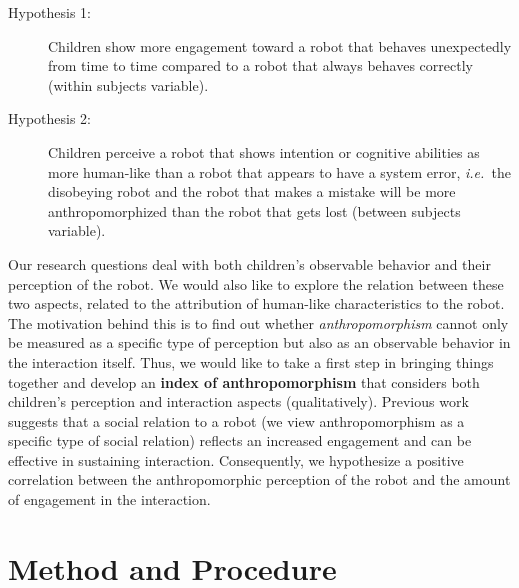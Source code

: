\documentclass{sig-alternate}
\newcommand{\ie}{{\textit{i.e.~}}}
\begin{document}
\begin{description}

    \item[Hypothesis 1:] Children show more engagement toward a robot that
        behaves unexpectedly from time to time compared to a robot that always
        behaves correctly (within subjects variable).

    \item[Hypothesis 2:] Children perceive a robot that shows intention or
        cognitive abilities as more human-like than a robot that appears to have
        a system error, \ie the disobeying robot and the robot that makes a
        mistake will be more anthropomorphized than the robot that gets lost
        (between subjects variable).

\end{description}


Our research questions deal with both children's observable behavior and their
perception of the robot. We would also like to explore the relation between
these two aspects, related to the attribution of human-like characteristics to
the robot. The motivation behind this is to find out whether
\textit{anthropomorphism} cannot only be measured as a specific type of
perception but also as an observable behavior in the interaction itself. Thus,
we would like to take a first step in bringing things together and develop an
\textbf{index of anthropomorphism} that considers both children's perception and
interaction aspects (qualitatively). Previous work suggests that a social
relation to a robot (we view anthropomorphism as a specific type of social
relation) reflects an increased engagement and can be effective in sustaining
interaction. Consequently, we hypothesize a positive correlation between the
anthropomorphic perception of the robot and the amount of engagement in the
interaction.




\section{Method and Procedure}
\end{document}
